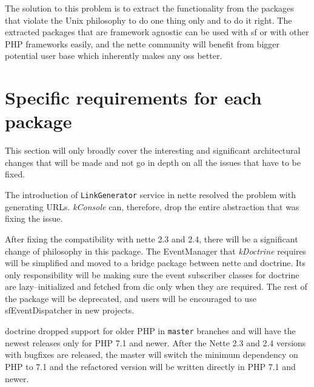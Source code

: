 The solution to this problem is to extract the functionality from the packages that violate the Unix philosophy to do one thing only and to do it right. The extracted packages that are framework agnostic can be used with \gls{sf} or with other PHP frameworks easily, and the \gls{nette} community will benefit from bigger potential user base which inherently makes any \gls{oss} better.

\section{Specific requirements for each package} \label{sec:roadmap:each-package}

This section will only broadly cover the interesting and significant architectural changes that will be made and not go in depth on all the issues that have to be fixed.


The introduction of \lstinline{LinkGenerator} service in \gls{nette} resolved the problem with generating URLs. \textit{\gls{kConsole}} can, therefore, drop the entire abstraction that was fixing the issue.


After fixing the compatibility with \gls{nette} 2.3 and 2.4, there will be a significant change of philosophy in this package. The EventManager that \textit{\gls{kDoctrine}} requires will be simplified and moved to a bridge package between \gls{nette} and \gls{doctrine}. Its only responsibility will be making sure the event subscriber classes for \gls{doctrine} are lazy--initialized and fetched from \gls{dic} only when they are required. The rest of the package will be deprecated, and users will be encouraged to use \gls{sfEventDispatcher} in new projects.




\gls{doctrine} dropped support for older PHP in \lstinline{master} branches and will have the newest releases only for PHP 7.1 and newer. After the Nette 2.3 and 2.4 versions with bugfixes are released, the master will switch the minimum dependency on PHP to 7.1 and the refactored version will be written directly in PHP 7.1 and newer.

